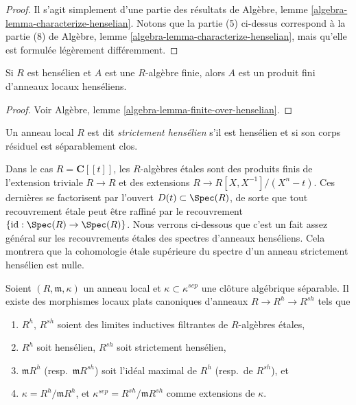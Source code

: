 \begin{proof}
Il s'agit simplement d'une partie des r\'esultats de
Algèbre, lemme \ref{algebra-lemma-characterize-henselian}.
Notons que la partie (5) ci-dessus correspond \`a la partie (8) de
Algèbre, lemme \ref{algebra-lemma-characterize-henselian},
mais qu'elle est formul\'ee l\'eg\`erement diff\'eremment.
\end{proof}

\begin{lemma}
\label{lemma-finite-over-henselian}
Si $R$ est hens\'elien et $A$ est une $R$-alg\`ebre finie, alors $A$ est un produit
fini d'anneaux locaux hens\'eliens.
\end{lemma}

\begin{proof}
Voir
Algèbre, lemme \ref{algebra-lemma-finite-over-henselian}.
\end{proof}

\begin{definition}
\label{definition-strictly-henselian}
Un anneau local $R$ est dit {\it strictement hens\'elien} s'il est hens\'elien et si son
corps r\'esiduel est s\'eparablement clos.
\end{definition}

\begin{example}
\label{example-powerseries}
Dans le cas $R = \mathbf{C}[[t]]$, les $R$-alg\`ebres \'etales sont des produits finis
de l'extension triviale $R \to R$ et des extensions
$R \to R[X, X^{-1}]/(X^n-t)$.
Ces derni\`eres se factorisent par l'ouvert $D(t) \subset \Spec(R)$, de sorte que tout
recouvrement \'etale peut \^etre raffin\'e par le recouvrement
$\{\text{id} : \Spec(R) \to \Spec(R)\}$. Nous verrons ci-dessous que
c'est un fait assez g\'en\'eral sur les recouvrements \'etales des spectres d'anneaux
hens\'eliens. Cela montrera que la cohomologie \'etale sup\'erieure du spectre d'un anneau
strictement hens\'elien est nulle.
\end{example}

\begin{theorem}
\label{theorem-henselization}
Soient $(R, \mathfrak m, \kappa)$ un anneau local et
$\kappa\subset\kappa^{sep}$ une cl\^oture alg\'ebrique s\'eparable.
Il existe des morphismes locaux plats canoniques d'anneaux $R \to R^h \to R^{sh}$ tels que
\begin{enumerate}
\item $R^h$, $R^{sh}$ soient des limites inductives filtrantes de $R$-alg\`ebres \'etales,
\item $R^h$ soit hens\'elien, $R^{sh}$ soit strictement hens\'elien,
\item $\mathfrak m R^h$ (resp.\ $\mathfrak m R^{sh}$) soit
l'id\'eal maximal de $R^h$ (resp.\ de $R^{sh}$), et
\item $\kappa = R^h/\mathfrak m R^h$, et
$\kappa^{sep} = R^{sh}/\mathfrak m R^{sh}$ comme extensions de $\kappa$.
\end{enumerate}
\end{theorem}

